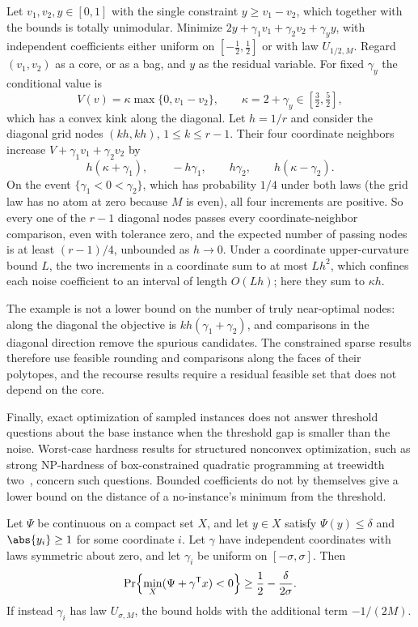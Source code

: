 \begin{example}\label{ex:lim:coupled}
Let $v_1,v_2,y\in[0,1]$ with the single constraint $y\ge v_1-v_2$, which
together with the bounds is totally unimodular. Minimize
$2y+\gamma_1v_1+\gamma_2v_2+\gamma_yy$, with independent coefficients either
uniform on $[-\frac12,\frac12]$ or with law $U_{1/2,M}$. Regard $(v_1,v_2)$
as a core, or as a bag, and $y$ as the residual variable. For fixed
$\gamma_y$ the conditional value is
\[
 V(v)=\kappa\max\{0,v_1-v_2\},\qquad\kappa=2+\gamma_y\in[\tfrac32,\tfrac52],
\]
which has a convex kink along the diagonal. Let $h=1/r$ and consider the
diagonal grid nodes $(kh,kh)$, $1\le k\le r-1$. Their four coordinate
neighbors increase $V+\gamma_1v_1+\gamma_2v_2$ by
\[
 h(\kappa+\gamma_1),\qquad-h\gamma_1,\qquad h\gamma_2,\qquad h(\kappa-\gamma_2).
\]
On the event $\{\gamma_1<0<\gamma_2\}$, which has probability $1/4$ under
both laws (the grid law has no atom at zero because $M$ is even), all four
increments are positive. So every one of the $r-1$ diagonal nodes passes
every coordinate-neighbor comparison, even with tolerance zero, and the
expected number of passing nodes is at least $(r-1)/4$, unbounded as
$h\to0$. Under a coordinate upper-curvature bound $L$, the two increments
in a coordinate sum to at most $Lh^2$, which confines each noise
coefficient to an interval of length $O(Lh)$; here they sum to $\kappa h$.
\end{example}

The example is not a lower bound on the number of truly near-optimal nodes:
along the diagonal the objective is $kh(\gamma_1+\gamma_2)$, and comparisons
in the diagonal direction remove the spurious candidates. The constrained
sparse results therefore use feasible rounding and comparisons along the
faces of their polytopes, and the recourse results require a residual
feasible set that does not depend on the core.

Finally, exact optimization of sampled instances does not answer threshold
questions about the base instance when the threshold gap is smaller than
the noise. Worst-case hardness results for structured nonconvex
optimization, such as strong NP-hardness of box-constrained quadratic
programming at treewidth two~\citep{DelPiaKhajavirad}, concern such
questions. Bounded coefficients do not by themselves give a lower bound on
the distance of a no-instance's minimum from the threshold.

\begin{proposition}\label{prop:lim:threshold}
Let $\Psi$ be continuous on a compact set $X$, and let $y\in X$ satisfy
$\Psi(y)\le\delta$ and $\abs{y_i}\ge1$ for some coordinate $i$. Let
$\gamma$ have independent coordinates with laws symmetric about zero, and
let $\gamma_i$ be uniform on $[-\sigma,\sigma]$. Then
\[
 \Pr\Bigl\{\min_X(\Psi+\gamma^{\mathsf T}x)<0\Bigr\}\ge\frac12-\frac\delta{2\sigma}.
\]
If instead $\gamma_i$ has law $U_{\sigma,M}$, the bound holds with the
additional term $-1/(2M)$.
\end{proposition}

